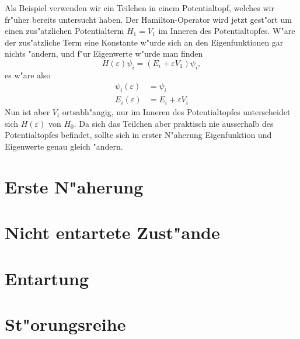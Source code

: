 \begin{beispiel}
Als Beispiel verwenden wir ein Teilchen in einem Potentialtopf, welches
wir fr"uher bereits untersucht haben. Der Hamilton-Operator wird jetzt
gest"ort um einen zus"atzlichen Potentialterm $H_1=V_1$ im Inneren
des Potentialtopfes.
W"are der zus"atzliche Term eine Konstante w"urde sich an den Eigenfunktionen
gar nichts "andern, und f"ur Eigenwerte w"urde man finden
\[
H(\varepsilon)\psi_i=(E_i + \varepsilon V_1)\psi_i,
\]
es w"are also
\begin{align*}
\psi_i(\varepsilon)&=\psi_i\\
E_i(\varepsilon)&=E_i+\varepsilon V_i
\end{align*}
Nun ist aber $V_i$ ortsabh"angig, nur im Inneren des Potentialtopfes 
unterscheidet sich $H(\varepsilon)$ von $H_0$. Da sich das Teilchen
aber praktisch nie ausserhalb des Potentialtopfes befindet, sollte
sich in erster N"aherung Eigenfunktion und Eigenwerte genau gleich
"andern.
\end{beispiel}



\section{Erste N"aherung}


\section{Nicht entartete Zust"ande}

\section{Entartung}

\section{St"orungsreihe}
